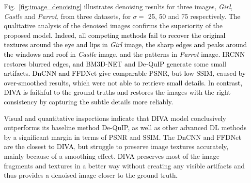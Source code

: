 \documentclass[10pt,journal,compsoc]{IEEEtran}
\newcommand{\sd}{\textcolor{black}}
\newcommand{\dk}{\textcolor{black}}
\begin{document}
Fig.~\ref{fig:image_denoising} illustrates denoising results for three images, \textit{Girl}, \textit{Castle} and \textit{Parrot}, from three datasets, for $\sigma =$ 25, 50 and 75 respectively. The qualitative analysis of the denoised images confirms the superiority of the proposed model.
\sd{Indeed, all competing methods fail to recover the original textures around the eye and lips in \textit{Girl} image, the sharp edges and peaks around the windows and roof in \textit{Castle} image, and the patterns in \textit{Parrot} image. IRCNN restores blurred edges, and BM3D-NET and De-QuIP generate some small artifacts. DnCNN and FFDNet give comparable PSNR, but low SSIM, caused by over-smoothed results, which were not able to retrieve small details. In contrast, \dk{DIVA} is faithful to the ground truths and restores the images with the right consistency by capturing the subtle details more reliably.}






Visual and quantitative inspections indicate that \dk{DIVA} model conclusively outperforms its baseline method De-QuIP, as well as other advanced DL methods by a significant margin in terms of PSNR and SSIM. The DnCNN and FFDNet are the closest to \dk{DIVA}, but struggle to preserve image textures accurately, mainly because of a smoothing effect. \dk{DIVA} preserves most of the image fragments and textures in a better way without creating any visible artifacts and thus provides a denoised image closer to the ground truth.
\end{document}
